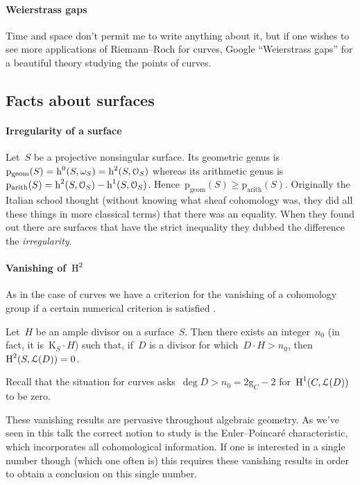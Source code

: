 \documentclass[10pt,a4paper]{article}
\begin{document}
\paragraph{Weierstrass gaps}
Time and space don't permit me to write anything about it, but if one wishes to see more applications of Riemann--Roch for curves, Google ``Weierstrass gaps'' for a beautiful theory studying the points of curves.

\subsection{Facts about surfaces}
\label{subsection:facts-surfaces}
\paragraph{Irregularity of a surface}
Let~$S$ be a projective nonsingular surface. Its geometric genus is~$\mathrm{p}_{\mathrm{geom}}(S)=\operatorname{h}^0(S,\omega_S)=\operatorname{h}^2(S,\mathcal{O}_S)$ whereas its arithmetic genus is~$\mathrm{p}_{\mathrm{arith}}(S)=\operatorname{h}^2(S,\mathcal{O}_S)-\operatorname{h}^1(S,\mathcal{O}_S)$. Hence~$\mathrm{p}_{\mathrm{geom}}(S)\geq\mathrm{p}_{\mathrm{arith}}(S)$. Originally the Italian school thought (without knowing what sheaf cohomology was, they did all these things in more classical terms) that there was an equality. When they found out there are surfaces that have the strict inequality they dubbed the difference the \emph{irregularity}.

\paragraph{Vanishing of~$\operatorname{H}^2$}
As in the case of curves we have a criterion for the vanishing of a cohomology group if a certain numerical criterion is satisfied \cite[lemma V.1.7]{hartshorne-algebraic-geometry}.
\begin{proposition}
  Let~$H$ be an ample divisor on a surface~$S$. Then there exists an integer~$n_0$ (in fact, it is~$\mathrm{K}_S\cdot H$) such that, if~$D$ is a divisor for which~$D\cdot H>n_0$, then~$\operatorname{H}^2(S,\mathcal{L}(D))=0$.
\end{proposition}
Recall that the situation for curves asks~$\deg D>n_0=2\mathrm{g}_C-2$ for~$\operatorname{H}^1(C,\mathcal{L}(D))$ to be zero.

These vanishing results are pervasive throughout algebraic geometry. As we've seen in this talk the correct notion to study is the Euler--Poincar\'e characteristic, which incorporates all cohomological information. If one is interested in a single number though (which one often is) this requires these vanishing results in order to obtain a conclusion on this single number.
\end{document}
